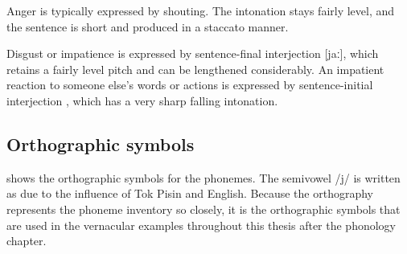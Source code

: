 
Anger is typically expressed by shouting.  The intonation stays fairly level, and the sentence is short and produced in a staccato manner.

Disgust or impatience is expressed by sentence-final interjection  [jaː], which retains a fairly level pitch and can be lengthened considerably.  An impatient reaction to someone else's words or actions is expressed by sentence-initial interjection , which has a very sharp falling intonation.







\subsection{Orthographic symbols}\label{sec:2:y:x}


 shows the orthographic symbols for the phonemes. The semivowel /j/ is written as  due to the influence of Tok Pisin and English.  Because the orthography represents the phoneme inventory so closely, it is the orthographic symbols that are used in the vernacular examples throughout this thesis after the phonology chapter.



